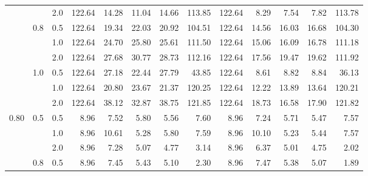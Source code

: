 \documentclass{article}
\begin{document}
{\begin{tabular}{lllrrrrrrrrrr}
          &     & 2.0 &  122.64 &       14.28 &                 11.04 &                    14.66 &         113.85 &  122.64 &        8.29 &                  7.54 &                     7.82 &         113.78 \\
          & 0.8 & 0.5 &  122.64 &       19.34 &                 22.03 &                    20.92 &         104.51 &  122.64 &       14.56 &                 16.03 &                    16.68 &         104.30 \\
          &     & 1.0 &  122.64 &       24.70 &                 25.80 &                    25.61 &         111.50 &  122.64 &       15.06 &                 16.09 &                    16.78 &         111.18 \\
          &     & 2.0 &  122.64 &       27.68 &                 30.77 &                    28.73 &         112.16 &  122.64 &       17.56 &                 19.47 &                    19.62 &         111.92 \\
          & 1.0 & 0.5 &  122.64 &       27.18 &                 22.44 &                    27.79 &          43.85 &  122.64 &        8.61 &                  8.82 &                     8.84 &          36.13 \\
          &     & 1.0 &  122.64 &       20.80 &                 23.67 &                    21.37 &         120.25 &  122.64 &       12.22 &                 13.89 &                    13.64 &         120.21 \\
          &     & 2.0 &  122.64 &       38.12 &                 32.87 &                    38.75 &         121.85 &  122.64 &       18.73 &                 16.58 &                    17.90 &         121.82 \\
     0.80 & 0.5 & 0.5 &    8.96 &        7.52 &                  5.80 &                     5.56 &           7.60 &    8.96 &        7.24 &                  5.71 &                     5.47 &           7.57 \\
          &     & 1.0 &    8.96 &       10.61 &                  5.28 &                     5.80 &           7.59 &    8.96 &       10.10 &                  5.23 &                     5.44 &           7.57 \\
          &     & 2.0 &    8.96 &        7.28 &                  5.07 &                     4.77 &           3.14 &    8.96 &        6.37 &                  5.01 &                     4.75 &           2.02 \\
          & 0.8 & 0.5 &    8.96 &        7.45 &                  5.43 &                     5.10 &           2.30 &    8.96 &        7.47 &                  5.38 &                     5.07 &           1.89 \\

\end{tabular}}
\end{document}
